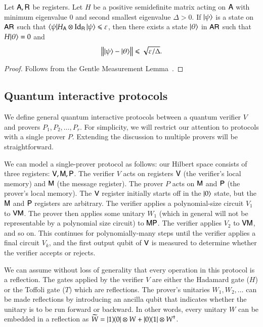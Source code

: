 \begin{lemma}
\label{lem:closeness_to_groundspace}
	Let ${\mathsf{A}}, {\mathsf{R}}$ be registers. Let $H$ be a positive semidefinite matrix acting on ${\mathsf{A}}$ with minimum eigenvalue $0$ and second smallest eigenvalue $\Delta > 0$. If $|\psi\rangle$ is a state on ${\mathsf{A}} {\mathsf{R}}$ such that $\langle\psi| H_{{\mathsf{A}}} \otimes \mathop{\mathrm{Id}}\!\mathinner{}_{{\mathsf{R}}} |\psi\rangle \leqslant \varepsilon$, then there exists a state $|\theta\rangle$ in ${\mathsf{A}} {\mathsf{R}}$ such that $H |\theta\rangle = 0$ and
	\[
		\left \| |\psi\rangle - |\theta\rangle \right \| \leqslant \sqrt{\varepsilon/\Delta}.
	\]
\end{lemma}
\begin{proof}
	Follows from the Gentle Measurement Lemma~\cite{ogawa2002new}.
\end{proof}

\subsection{Quantum interactive protocols} 

We define general quantum interactive protocols between a quantum verifier $V$ and provers $P_1,P_2,\ldots,P_r$. For simplicity, we will restrict our attention to protocols with a single prover $P$. Extending the discussion to multiple provers will be straightforward. 

We can model a single-prover protocol as follows: our Hilbert space consists of three registers: ${\mathsf{V}}, {\mathsf{M}}, {\mathsf{P}}$. The verifier $V$ acts on registers ${\mathsf{V}}$ (the verifier's local memory) and ${\mathsf{M}}$ (the message register). The prover $P$ acts on ${\mathsf{M}}$ and ${\mathsf{P}}$ (the prover's local memory). The ${\mathsf{V}}$ register initially starts off in the $|0\rangle$ state, but the ${\mathsf{M}}$ and ${\mathsf{P}}$ registers are arbitrary. The verifier applies a polynomial-size circuit $V_1$ to ${\mathsf{V}} {\mathsf{M}}$. The prover then applies some unitary $W_1$ (which in general will not be representable by a polynomial size circuit) to ${\mathsf{M}} {\mathsf{P}}$. The verifier applies $V_2$ to ${\mathsf{V}} {\mathsf{M}}$, and so on. This continues for polynomially-many steps until the verifier applies a final circuit $V_k$, and the first output qubit of ${\mathsf{V}}$ is measured to determine whether the verifier accepts or rejects.


We can assume without loss of generality that every operation in this protocol is a reflection. The gates applied by the verifier $V$ are either the Hadamard gate ($H$) or the Toffoli gate ($T$) which are reflections. The prover's unitaries $W_1, W_2,\ldots$ can be made reflections by introducing an ancilla qubit that indicates whether the unitary is to be run forward or backward. In other words, every unitary $W$ can be embedded in a reflection as $\widetilde{W} = |1\rangle\! \langle 0| \otimes W + |0\rangle\! \langle 1| \otimes W^\dagger$. 

